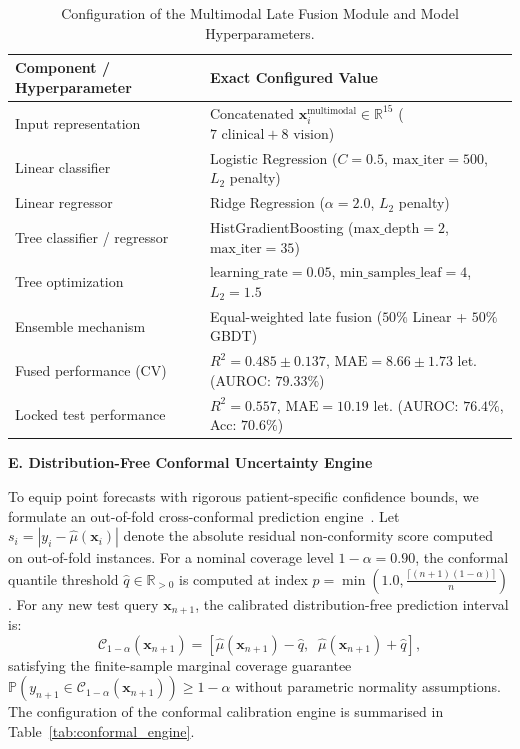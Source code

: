\documentclass[preprint,12pt]{elsarticle}
\begin{document}
\begin{table}[t]
\centering
\caption{Configuration of the Multimodal Late Fusion Module and Model Hyperparameters.}
\label{tab:late_fusion}
\renewcommand{\arraystretch}{1.1}
\footnotesize
\begin{tabular}{ll}
\toprule
\textbf{Component / Hyperparameter} & \textbf{Exact Configured Value} \\
\midrule
Input representation & Concatenated $\mathbf{x}_i^{\text{multimodal}} \in \mathbb{R}^{15}$ ($7\text{ clinical} + 8\text{ vision}$) \\
Linear classifier & Logistic Regression ($C = 0.5$, $\text{max\_iter} = 500$, $L_2$ penalty) \\
Linear regressor & Ridge Regression ($\alpha = 2.0$, $L_2$ penalty) \\
Tree classifier / regressor & HistGradientBoosting ($\text{max\_depth} = 2$, $\text{max\_iter} = 35$) \\
Tree optimization & $\text{learning\_rate} = 0.05$, $\text{min\_samples\_leaf} = 4$, $L_2 = 1.5$ \\
Ensemble mechanism & Equal-weighted late fusion ($50\%$ Linear + $50\%$ GBDT) \\
Fused performance (CV) & $R^2 = 0.485 \pm 0.137$, $\text{MAE} = 8.66 \pm 1.73$ let. (AUROC: $79.33\%$) \\
Locked test performance & $R^2 = 0.557$, $\text{MAE} = 10.19$ let. (AUROC: $76.4\%$, Acc: $70.6\%$) \\
\bottomrule
\end{tabular}
\end{table}

\noindent\textbf{E. Distribution-Free Conformal Uncertainty Engine}

To equip point forecasts with rigorous patient-specific confidence bounds, we formulate an out-of-fold cross-conformal prediction engine~\cite{angelopoulos2021}. Let $s_i = |y_i - \hat{\mu}(\mathbf{x}_i)|$ denote the absolute residual non-conformity score computed on out-of-fold instances. For a nominal coverage level $1-\alpha = 0.90$, the conformal quantile threshold $\hat{q} \in \mathbb{R}_{>0}$ is computed at index $p = \min(1.0, \frac{\lceil (n+1)(1-\alpha) \rceil}{n})$. For any new test query $\mathbf{x}_{n+1}$, the calibrated distribution-free prediction interval is:
\begin{equation}
\mathcal{C}_{1-\alpha}(\mathbf{x}_{n+1}) = \left[ \hat{\mu}(\mathbf{x}_{n+1}) - \hat{q}, \;\; \hat{\mu}(\mathbf{x}_{n+1}) + \hat{q} \right],
\end{equation}
satisfying the finite-sample marginal coverage guarantee $\mathbb{P}(y_{n+1} \in \mathcal{C}_{1-\alpha}(\mathbf{x}_{n+1})) \ge 1 - \alpha$ without parametric normality assumptions. The configuration of the conformal calibration engine is summarised in Table~\ref{tab:conformal_engine}.
\end{document}
